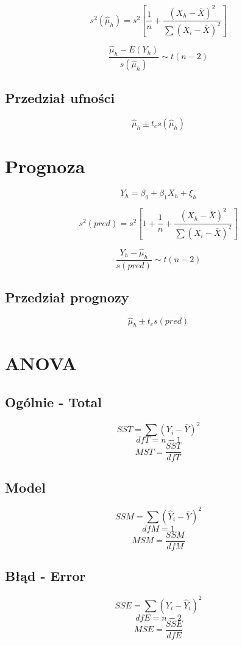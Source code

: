 \documentclass[9pt]{article}  %
\begin{document}
  
    
  $$s^2 (\hat{\mu}_h) = s^2 \left[  \frac{1}{n} + \frac{(X_h-\bar{X})^2 }{\sum{(X_i-\bar{X})^2} }   \right]$$


  $$ \frac{ \hat{\mu}_h - E(Y_h) }{s(\hat{\mu}_h) } \sim t(n-2) $$


  \subsection{Przedział ufności}

    $$\hat{\mu}_h \pm t_c s(\hat{\mu}_h) $$
    
    
    
\section{Prognoza}

  $$Y_h = \beta_0 + \beta_1 X_h + \xi_h$$
  
  
    $$s^2 (pred) = s^2 \left[ 1+ \frac{1}{n} + \frac{(X_h-\bar{X})^2 }{\sum{(X_i-\bar{X})^2} }   \right]$$
    
    $$ \frac{Y_h -  \hat{\mu}_h }{s(pred)} \sim t(n-2)$$
    
    
      \subsection{Przedział prognozy}

    $$\hat{\mu}_h \pm t_c s(pred) $$
    
\section{ANOVA}

  \subsection{Ogólnie - Total}
  
  $$ SST = \sum(Y_i - \bar{Y})^2  $$
  $$dfT = n-1$$
  $$ MST = \frac{SST}{dfT}$$
  
  
  \subsection{Model}
  
  $$ SSM = \sum(\hat{Y}_i - \bar{Y})^2  $$
  $$dfM = 1$$
  $$ MSM = \frac{SSM}{dfM}$$
  
  \subsection{Błąd - Error}
  
    $$ SSE = \sum(Y_i - \hat{Y}_i)^2  $$
  $$dfE = n-2$$
  $$ MSE = \frac{SSE}{dfE}$$
  
  
  
  
  
  
\end{document}
